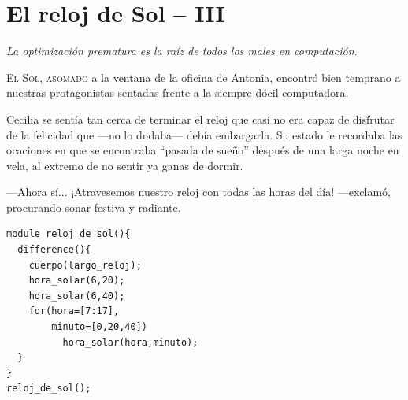 \chapter{El reloj de Sol -- III}
\label{sec:el-reloj-de-sol-iii}



\hfill%
\begin{minipage}[]{.60\linewidth}
\begin{flushright}
  \emph{La optimización prematura es la raíz de todos los males en
    computación.}\footnotemark
\end{flushright}
\end{minipage}

\vspace{4ex} \lettrine[lines=2]{E}{l Sol, asomado} a la ventana de la
oficina de Antonia, encontró bien temprano a nuestras protagonistas
sentadas frente a la siempre dócil computadora.

Cecilia se sentía tan cerca de terminar el reloj que casi no era capaz
de disfrutar de la felicidad que ---no lo dudaba--- debía
embargarla. Su estado le recordaba las ocaciones en que se encontraba
``pasada de sueño'' después de una larga noche en vela, al extremo de
no sentir ya ganas de dormir.

---Ahora sí... ¡Atravesemos nuestro reloj con todas las horas del día!
---exclamó, procurando sonar festiva y radiante.

 \begin{lstlisting}
module reloj_de_sol(){
  difference(){
    cuerpo(largo_reloj);    
    hora_solar(6,20);
    hora_solar(6,40);
    for(hora=[7:17],
        minuto=[0,20,40])
          hora_solar(hora,minuto);
  }
}
reloj_de_sol();
 \end{lstlisting}%

